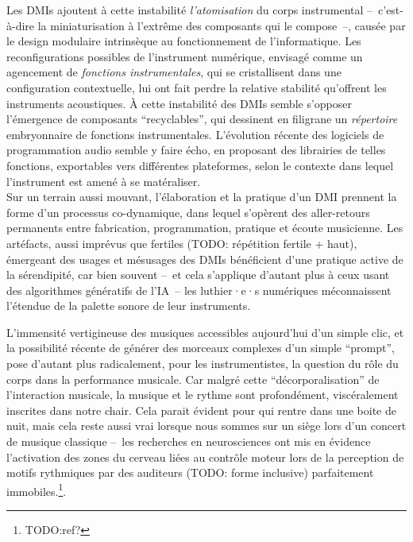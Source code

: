 Les \glspl{DMI} ajoutent à cette instabilité \textit{l'atomisation} du corps instrumental --~c'est-à-dire la miniaturisation à l'extrême des composants qui le compose~--, causée par le design modulaire intrinsèque au fonctionnement de l'informatique. Les reconfigurations possibles de l'instrument numérique, envisagé comme un agencement de \textit{fonctions instrumentales}, qui se cristallisent dans une configuration contextuelle, lui ont fait perdre la relative stabilité qu'offrent les instruments acoustiques. À cette instabilité des \glspl{DMI} semble s'opposer l'émergence de composants ``recyclables'', qui dessinent en filigrane un \textit{répertoire} embryonnaire de fonctions instrumentales. L'évolution récente des logiciels de programmation audio semble y faire écho, en proposant des librairies de telles fonctions, exportables vers différentes plateformes, selon le contexte dans lequel l'instrument est amené à se matéraliser.\\
\indent Sur un terrain aussi mouvant, l'élaboration et la pratique d'un \gls{DMI} prennent la forme d'un processus co-dynamique, dans lequel s'opèrent des aller-retours permanents entre fabrication, programmation, pratique et écoute musicienne.
Les artéfacts, aussi imprévus que fertiles (TODO: répétition fertile + haut), émergeant des usages et mésusages des \glspl{DMI} bénéficient d'une pratique active de la sérendipité, car bien souvent --~et cela s'applique d'autant plus à ceux usant des algorithmes génératifs de l'IA~-- les luthier·e·s numériques méconnaissent l'étendue de la palette sonore de leur instruments.

L'immensité vertigineuse des musiques accessibles aujourd'hui d'un simple clic, et la possibilité récente de générer des morceaux complexes d'un simple ``prompt'', pose d'autant plus radicalement, pour les instrumentistes, la question du rôle du corps dans la performance musicale. Car malgré cette ``décorporalisation'' de l'interaction musicale, la musique et le rythme sont profondément, viscéralement inscrites dans notre chair. Cela parait évident pour qui rentre dans une boite de nuit, mais cela reste aussi vrai lorsque nous sommes sur un siège lors d'un concert de musique classique --~les recherches en neurosciences ont mis en évidence l'activation des zones du cerveau liées au contrôle moteur lors de la perception de motifs rythmiques par des auditeurs (TODO: forme inclusive) parfaitement immobiles.\footnote{TODO:ref?}.\\


